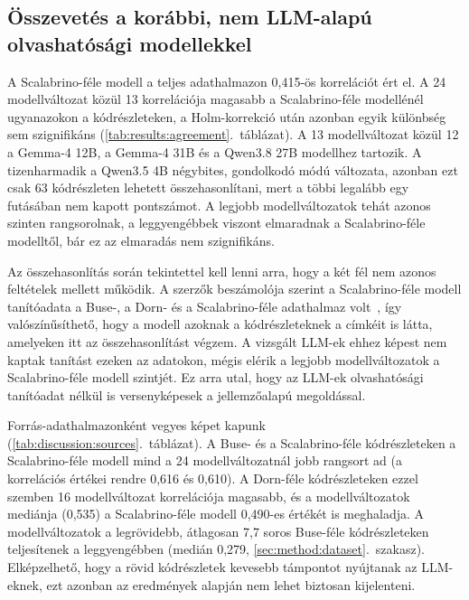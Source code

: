 \documentclass[
]{elteikthesis}[2024/04/26]
\begin{document}
\subsection{Összevetés a korábbi, nem LLM-alapú olvashatósági modellekkel}
\label{sec:discussion:classic}

A Scalabrino-féle modell a teljes adathalmazon 0,415-ös korrelációt ért el.
A 24 modellváltozat közül 13 korrelációja magasabb a Scalabrino-féle modellénél ugyanazokon a kódrészleteken,
a Holm-korrekció után azonban egyik különbség sem szignifikáns (\ref{tab:results:agreement}.~táblázat).
A 13 modellváltozat közül 12 a Gemma-4 12B, a Gemma-4 31B és a Qwen3.8 27B modellhez tartozik.
A tizenharmadik a Qwen3.5 4B négybites, gondolkodó módú változata,
azonban ezt csak 63 kódrészleten lehetett összehasonlítani,
mert a többi legalább egy futásában nem kapott pontszámot.
A legjobb modellváltozatok tehát azonos szinten rangsorolnak,
a leggyengébbek viszont elmaradnak a Scalabrino-féle modelltől,
bár ez az elmaradás nem szignifikáns.

Az összehasonlítás során tekintettel kell lenni arra,
hogy a két fél nem azonos feltételek mellett működik.
A szerzők beszámolója szerint a Scalabrino-féle modell tanítóadata a Buse-,
a Dorn- és a Scalabrino-féle adathalmaz volt~\cite{scalabrino2018comprehensive},
így valószínűsíthető, hogy a modell azoknak a kódrészleteknek a címkéit is látta,
amelyeken itt az összehasonlítást végzem.
A vizsgált LLM-ek ehhez képest nem kaptak tanítást ezeken az adatokon,
mégis elérik a legjobb modellváltozatok a Scalabrino-féle modell szintjét.
Ez arra utal, hogy az LLM-ek olvashatósági tanítóadat nélkül is versenyképesek a jellemzőalapú megoldással.

Forrás-adathalmazonként vegyes képet kapunk (\ref{tab:discussion:sources}.~táblázat).
A Buse- és a Scalabrino-féle kódrészleteken a Scalabrino-féle modell
mind a 24 modellváltozatnál jobb rangsort ad (a korrelációs értékei rendre 0,616 és 0,610).
A Dorn-féle kódrészleteken ezzel szemben 16 modellváltozat korrelációja magasabb,
és a modellváltozatok mediánja (0,535) a Scalabrino-féle modell 0,490-es értékét is meghaladja.
A modellváltozatok a legrövidebb, átlagosan 7,7 soros Buse-féle
kódrészleteken teljesítenek a leggyengébben (medián 0,279, \ref{sec:method:dataset}.~szakasz).
Elképzelhető, hogy a rövid kódrészletek kevesebb támpontot nyújtanak az LLM-eknek,
ezt azonban az eredmények alapján nem lehet biztosan kijelenteni.
\end{document}
